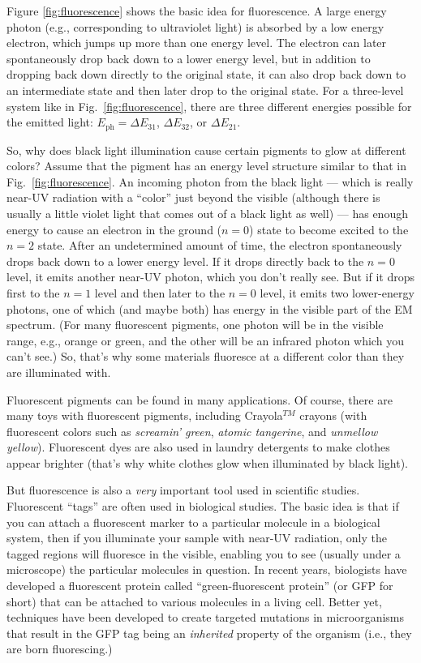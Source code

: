 Figure \ref{fig:fluorescence} shows the basic idea for fluorescence.
A large energy photon (e.g., corresponding to ultraviolet light)
is absorbed by a low energy electron, which jumps up more than one
energy level.  The electron can later spontaneously drop back down to
a lower energy level, but in addition to dropping back down directly to
the original state, it can also drop back down to an intermediate state
and then later drop to the original state. For a three-level system
like in Fig.~\ref{fig:fluorescence}, there are three different energies
possible for the emitted light: $E_\text{ph} = \Delta E_{31}$, $\Delta E_{32}$,
or $\Delta E_{21}$.

So, why does black light illumination cause certain pigments to glow at
different colors?  Assume that the pigment has an energy level structure
similar to that in Fig.~\ref{fig:fluorescence}. An incoming photon from
the black light --- which is really near-UV radiation with a ``color''
just beyond the visible (although there is usually a little violet light
that comes out of a black light as well) --- has enough energy to cause an
electron in the ground ($n = 0$) state to become excited to the $n = 2$
state. After an undetermined amount of time, the electron spontaneously
drops back down to a lower energy level. If it drops directly back to
the $n = 0$ level, it emits another near-UV photon, which you don't
really see. But if it drops first to the $n = 1$ level and then later
to the $n = 0$ level, it emits two lower-energy photons, one of which
(and maybe both) has energy in the visible part of the EM spectrum.
(For many fluorescent pigments, one photon will be in the visible range,
e.g., orange or green, and the other will be an infrared photon which you
can't see.) So, that's why some materials fluoresce at a different
color than they are illuminated with.

Fluorescent pigments can be found in many applications. Of course,
there are many toys with fluorescent pigments, including Crayola$^{TM}$
crayons (with fluorescent colors such as {\it screamin' green}, {\it
atomic tangerine}, and {\it unmellow yellow}). Fluorescent dyes are also
used in laundry detergents to make clothes appear brighter (that's why
white clothes glow when illuminated by black light).

But fluorescence is also a {\it very} important tool used in scientific
studies.  Fluorescent ``tags'' are often used in biological studies. The
basic idea is that if you can attach a fluorescent marker to a particular
molecule in a biological system, then if you illuminate your sample with
near-UV radiation, only the tagged regions will fluoresce in the visible,
enabling you to see (usually under a microscope) the particular molecules
in question. In recent years, biologists have developed a fluorescent
protein called ``green-fluorescent protein'' (or GFP for short) that can
be attached to various molecules in a living cell. Better yet, techniques
have been developed to create targeted mutations in microorganisms that
result in the GFP tag being an {\it inherited} property of the organism
(i.e., they are born fluorescing.)

